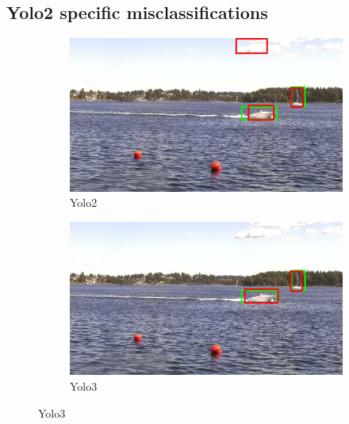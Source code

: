 \subsection{Yolo2 specific misclassifications}
\label{sec:yolo2_spec_misc}
\begin{figure}[h!]
\begin{subfigure}{.5\textwidth}
  \centering
  \includegraphics[width=0.9\linewidth]{results/case_buildings/yolo23/grove/yolo2/selected_06_25_frame0357.jpg}
  \caption{Yolo2}
\end{subfigure}%
\begin{subfigure}{.5\textwidth}
  \centering
  \includegraphics[width=.9\linewidth]{results/case_buildings/yolo23/grove/yolo3/selected_06_25_frame0357.jpg}
  \caption{Yolo3}
\end{subfigure}


\end{figure}
